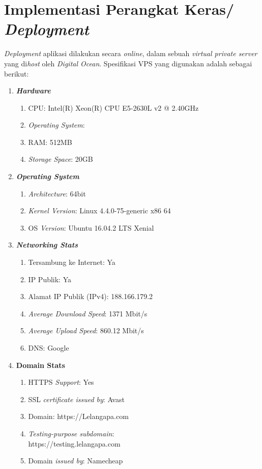   \section{Implementasi Perangkat Keras/ \textit{Deployment}}
  
	\textit{Deployment} aplikasi dilakukan secara \textit{online}, dalam sebuah \textit{virtual private server} yang di\textit{host} oleh \textit{Digital Ocean}.
  Spesifikasi VPS yang digunakan adalah sebagai berikut:
  
  \begin{enumerate}
  	\item \textbf{\textit{Hardware}}
  	\begin{enumerate}
  		\item CPU: Intel(R) Xeon(R) CPU E5-2630L v2 @ 2.40GHz
  		\item \textit{Operating System}: 
  		\item RAM: 512MB
  		\item \textit{Storage Space}: 20GB
  	\end{enumerate}
  	
  	\item \textbf{\textit{Operating System}}
  	\begin{enumerate}
  		\item \textit{Architecture}: 64bit
  		\item \textit{Kernel Version}: Linux 4.4.0-75-generic x86 64
  		\item OS \textit{Version}: Ubuntu 16.04.2 LTS Xenial
  	\end{enumerate}
  	
  	\item \textit{\textbf{Networking Stats}}
  	\begin{enumerate}
  		\item Tersambung ke Internet: Ya
  		\item IP Publik: Ya
  		\item Alamat IP Publik (IPv4): 188.166.179.2
  		\item \textit{Average Download Speed}: 1371 Mbit/s
  		\item \textit{Average Upload Speed}: 860.12 Mbit/s
  		\item DNS: Google
  	\end{enumerate}
  	
  	\item \textbf{\textbf{Domain Stats}}
  	\begin{enumerate}
  		\item HTTPS \textit{Support}: Yes
  		\item SSL \textit{certificate issued by}: Avast
  		\item Domain: https://Lelangapa.com
  		\item \textit{Testing-purpose subdomain}: \\https://testing.lelangapa.com
  		\item Domain \textit{issued by}: Namecheap
  	\end{enumerate}
  	
  \end{enumerate}
  
